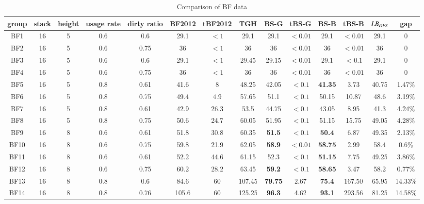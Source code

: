 \documentclass[review,3p,times,authoryear,12pt]{elsarticle}
\begin{document}
\begin{table}[htbp]
\caption{\label{tab:bf} Comparison of BF data}
\scriptsize
\begin{tabular}{c|c|c|c|c|c|c|c|c|c|c|c|c|c}
  \hline
  group & stack & height & usage rate & dirty ratio & BF2012 & tBF2012 & TGH   & BS-G  & tBS-G & BS-B  & tBS-B & $\id{LB}_\id{DFS}$ & gap\\
    \hline
    BF1   & 16 & 5  & 0.6 & 0.6  & 29.1  & $<1$  & 29.1   & 29.1          & $<0.01$ & 29.1           & $<0.01$ & 29.1  & 0\\
    BF2   & 16 & 5  & 0.6 & 0.75 & 36    & $<1$  & 36     & 36            & $<0.01$ & 36             & $<0.01$ & 36    & 0\\
    BF3   & 16 & 5  & 0.6 & 0.6  & 29.1  & $<1$  & 29.45  & 29.15         & $<0.01$ & 29.1           & $<0.1$  & 29.1  & 0\\
    BF4   & 16 & 5  & 0.6 & 0.75 & 36    & $<1$  & 36     & 36            & $<0.01$ & 36             & $<0.01$ & 36    & 0\\
    BF5   & 16 & 5  & 0.8 & 0.61 & 41.6  & 8     & 48.25  & 42.05         & $<0.1$  & \textbf{41.35} & 3.73    & 40.75 & 1.47\%\\
    BF6   & 16 & 5  & 0.8 & 0.75 & 49.4  & 4.9   & 57.65  & 51.1          & $<0.1$  & 50.15          & 10.87   & 48.6  & 3.19\%\\
    BF7   & 16 & 5  & 0.8 & 0.61 & 42.9  & 26.3  & 53.5   & 44.75         & $<0.1$  & 43.05          & 8.95    & 41.3  & 4.24\%\\
    BF8   & 16 & 5  & 0.8 & 0.75 & 50.6  & 24.7  & 60.05  & 51.95         & $<0.1$  & 51.15          & 15.75   & 49.05 & 4.28\%\\
    BF9   & 16 & 8  & 0.6 & 0.61 & 51.8  & 30.8  & 60.35  & \textbf{51.5} & $<0.1$  & \textbf{50.4}  & 6.87    & 49.35 & 2.13\%\\
    BF10  & 16 & 8  & 0.6 & 0.75 & 59.8  & 21.9  & 62.05  & \textbf{58.9} & $<0.01$ & \textbf{58.75} & 2.99    & 58.4  & 0.6\%\\
    BF11  & 16 & 8  & 0.6 & 0.61 & 52.2  & 44.6  & 61.15  & 52.3          & $<0.1$  & \textbf{51.15} & 7.75    & 49.25 & 3.86\%\\
    BF12  & 16 & 8  & 0.6 & 0.75 & 60.2  & 28.2  & 63.45  & \textbf{59.2} & $<0.1$  & \textbf{58.65} & 3.47    & 58.2  & 0.77\%\\
    BF13  & 16 & 8  & 0.8 & 0.6  & 84.6  & 60    & 107.45 & \textbf{79.75}& 2.67    & \textbf{75.4}  & 167.50  & 65.95 & 14.33\%\\
    BF14  & 16 & 8  & 0.8 & 0.76 & 105.6 & 60    & 125.25 & \textbf{96.3} & 4.62    & \textbf{93.1}  & 293.56  & 81.25 & 14.58\%\\

\end{tabular}
\end{table}
\end{document}
